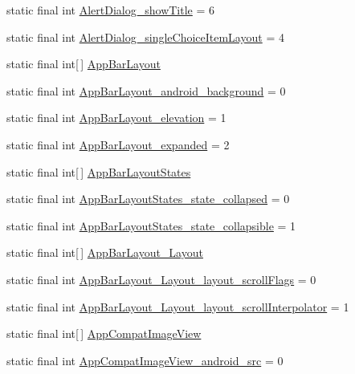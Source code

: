 \begin{CompactItemize}
static final int \hyperlink{classandroid_1_1support_1_1v4_1_1_r_1_1styleable_a4d768767c275e92e5916084f753a001}{AlertDialog\_\-showTitle} = 6
\item 
static final int \hyperlink{classandroid_1_1support_1_1v4_1_1_r_1_1styleable_448e0ef41be3c7030dcffa62d3922bfb}{AlertDialog\_\-singleChoiceItemLayout} = 4
\item 
static final int\mbox{[}$\,$\mbox{]} \hyperlink{classandroid_1_1support_1_1v4_1_1_r_1_1styleable_3a761a70ae130af1cc59eb59b6d9ebab}{AppBarLayout}
\item 
static final int \hyperlink{classandroid_1_1support_1_1v4_1_1_r_1_1styleable_fce6e3c20cb96f7b80bda80af8f47843}{AppBarLayout\_\-android\_\-background} = 0
\item 
static final int \hyperlink{classandroid_1_1support_1_1v4_1_1_r_1_1styleable_2f6bfe67d7eabf605f67fef684ca8ae1}{AppBarLayout\_\-elevation} = 1
\item 
static final int \hyperlink{classandroid_1_1support_1_1v4_1_1_r_1_1styleable_4df0dd27ad44fc101d644efef542c6e3}{AppBarLayout\_\-expanded} = 2
\item 
static final int\mbox{[}$\,$\mbox{]} \hyperlink{classandroid_1_1support_1_1v4_1_1_r_1_1styleable_5c129aa478b2daed266bd62010493d47}{AppBarLayoutStates}
\item 
static final int \hyperlink{classandroid_1_1support_1_1v4_1_1_r_1_1styleable_49f2e5ab50fd3854eddcdef4b7557292}{AppBarLayoutStates\_\-state\_\-collapsed} = 0
\item 
static final int \hyperlink{classandroid_1_1support_1_1v4_1_1_r_1_1styleable_fac3d50c34559fba4e1874fb3151376d}{AppBarLayoutStates\_\-state\_\-collapsible} = 1
\item 
static final int\mbox{[}$\,$\mbox{]} \hyperlink{classandroid_1_1support_1_1v4_1_1_r_1_1styleable_3e73f9e75520cf590d9355042c5d4099}{AppBarLayout\_\-Layout}
\item 
static final int \hyperlink{classandroid_1_1support_1_1v4_1_1_r_1_1styleable_77c239ef8452106864e05fd3dabb1747}{AppBarLayout\_\-Layout\_\-layout\_\-scrollFlags} = 0
\item 
static final int \hyperlink{classandroid_1_1support_1_1v4_1_1_r_1_1styleable_ffbd29e3aa103fef348ea2fe39dfda75}{AppBarLayout\_\-Layout\_\-layout\_\-scrollInterpolator} = 1
\item 
static final int\mbox{[}$\,$\mbox{]} \hyperlink{classandroid_1_1support_1_1v4_1_1_r_1_1styleable_6785f800ea84c577c1f75fe389b114f0}{AppCompatImageView}
\item 
static final int \hyperlink{classandroid_1_1support_1_1v4_1_1_r_1_1styleable_dfb6d5b58f6d14c12d268d2b97125be9}{AppCompatImageView\_\-android\_\-src} = 0

\end{CompactItemize}
